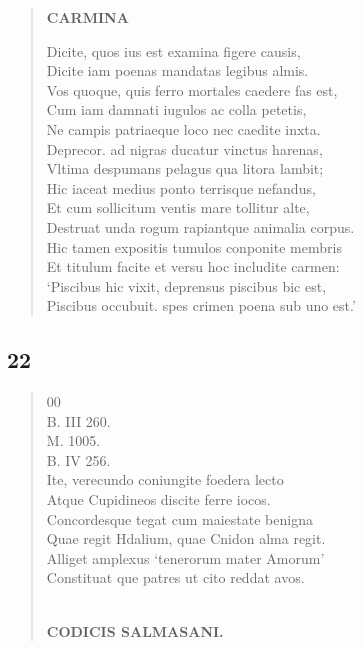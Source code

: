 \documentclass[11pt, a4paper]{report}
\begin{document}
\begin{verse}
    \begin{center} \textbf{CARMINA} \end{center} \marginpar{[96]} Dicite, quos ius est examina figere causis, \\ Dicite iam poenas mandatas legibus almis. \\ Vos quoque, quis ferro mortales caedere fas est, \\ Cum iam damnati iugulos ac colla petetis, \\ Ne campis patriaeque loco nec caedite inxta. \\ Deprecor. ad nigras ducatur vinctus harenas, \\ Vltima despumans pelagus qua litora lambit; \\ Hic iaceat medius ponto terrisque nefandus, \\ Et cum sollicitum ventis mare tollitur alte, \\ Destruat unda rogum rapiantque animalia corpus. \\ Hic tamen expositis tumulos conponite membris \\ Et titulum facite et versu hoc includite carmen: \\ ‘Piscibus hic vixit, deprensus piscibus bic est, \\ Piscibus occubuit. spes crimen poena sub uno est.’ \\ 
      \end{verse}
  
            \subsection*{22}
      \begin{verse}
      00 \\ B. III 260. \\ M. 1005. \\ B. IV 256. \\ Ite, verecundo coniungite foedera lecto \\ Atque Cupidineos discite ferre iocos. \\ Concordesque tegat cum maiestate benigna \\ Quae regit Hdalium, quae Cnidon alma regit. \\ Alliget amplexus ‘tenerorum mater Amorum’ \\ Constituat \lbrack que \rbrack  patres ut cito reddat avos. \\ 
        ﻿\pagebreak 
    \begin{center} \textbf{CODICIS SALMASANI.} \end{center} \marginpar{[97]} 
      \end{verse}
  
\end{document}

